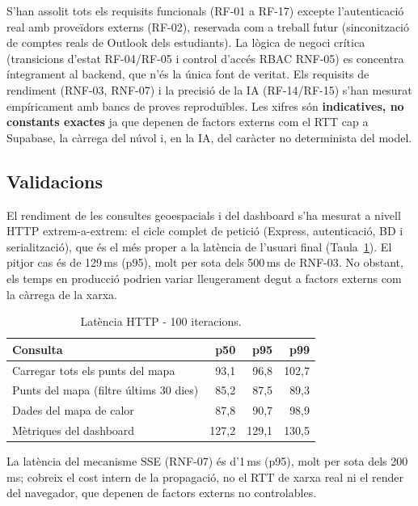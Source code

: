 \documentclass[10pt,a4paper,twocolumn,twoside]{article}
\begin{document}
		S'han assolit tots els requisits funcionals (RF-01 a RF-17) excepte l'autenticació real amb proveïdors externs (RF-02), reservada com a treball futur (sinconització de comptes reals de Outlook dels estudiants). La lògica de negoci crítica (transicions d'estat RF-04/RF-05 i control d'accés RBAC RNF-05) es concentra íntegrament al backend, que n'és la única font de veritat. Els requisits de rendiment (RNF-03, RNF-07) i la precisió de la IA (RF-14/RF-15) s'han mesurat empíricament amb bancs de proves reproduïbles. Les xifres són \textbf{indicatives, no constants exactes} ja que depenen de factors externs com el RTT cap a Supabase, la càrrega del núvol i, en la IA, del caràcter no determinista del model.
		
		\subsection{Validacions}
		El rendiment de les consultes geoespacials i del dashboard s'ha mesurat a nivell HTTP extrem-a-extrem: el cicle complet de petició (Express, autenticació, BD i serialització), que és el més proper a la latència de l'usuari final (Taula~\ref{tab:rnf03http}). El pitjor cas és de 129\,ms (p95), molt per sota dels 500\,ms de RNF-03. No obstant, els temps en producció podrien variar lleugerament degut a factors externs com la càrrega de la xarxa. 
		
		\begin{table}[H]
			\centering
			\footnotesize
			\caption{Latència HTTP - 100 iteracions.}
			\label{tab:rnf03http}
			\begin{tabular}{|l|r|r|r|}
				\hline
				Consulta & p50 & p95 & p99 \\
				\hline
				Carregar tots els punts del mapa & 93,1 & 96,8 & 102,7 \\
				\hline
				Punts del mapa (filtre últims 30 dies) & 85,2 & 87,5 & 89,3 \\
				\hline
				Dades del mapa de calor & 87,8 & 90,7 & 98,9 \\
				\hline
				Mètriques del dashboard & 127,2 & 129,1 & 130,5 \\
				\hline
			\end{tabular}
		\end{table}
		
		La latència del mecanisme SSE (RNF-07) és d'1\,ms (p95), molt per sota dels 200\,ms; cobreix el cost intern de la propagació, no el RTT de xarxa real ni el render del navegador, que depenen de factors externs no controlables.
		
\end{document}
